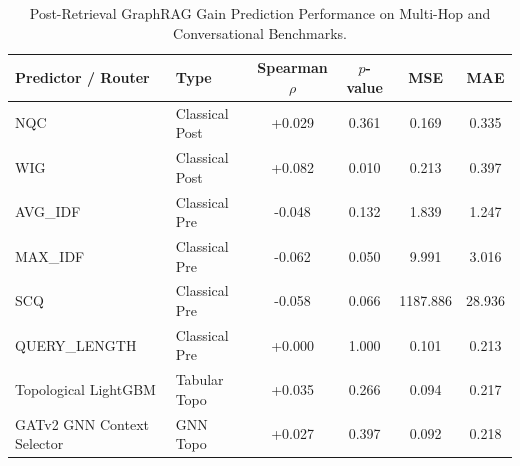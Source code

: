 \begin{table}[t]
\centering
\small
\caption{Post-Retrieval GraphRAG Gain Prediction Performance on Multi-Hop and Conversational Benchmarks.}
\label{tab:qpp_correlations}
\begin{tabular}{llcccc}
\toprule
\textbf{Predictor / Router} & \textbf{Type} & \textbf{Spearman $\rho$} & \textbf{$p$-value} & \textbf{MSE} & \textbf{MAE} \\
\midrule
NQC & Classical Post & +0.029 & 0.361 & 0.169 & 0.335 \\
WIG & Classical Post & +0.082 & 0.010 & 0.213 & 0.397 \\
AVG_IDF & Classical Pre & -0.048 & 0.132 & 1.839 & 1.247 \\
MAX_IDF & Classical Pre & -0.062 & 0.050 & 9.991 & 3.016 \\
SCQ & Classical Pre & -0.058 & 0.066 & 1187.886 & 28.936 \\
QUERY_LENGTH & Classical Pre & +0.000 & 1.000 & 0.101 & 0.213 \\
Topological LightGBM & Tabular Topo & +0.035 & 0.266 & 0.094 & 0.217 \\
GATv2 GNN Context Selector & GNN Topo & +0.027 & 0.397 & 0.092 & 0.218 \\
\bottomrule
\end{tabular}
\end{table}